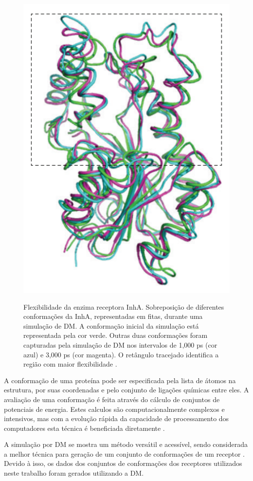 \begin{figure}[h]
	\center
	\includegraphics[scale=0.4]{images/dm_inha.png}
	\label{fig:dm}
	\caption{Flexibilidade da enzima receptora InhA. Sobreposição de diferentes conformações da InhA, representadas em fitas, durante uma simulação de DM. A conformação inicial da simulação está representada pela cor verde. Outras duas conformações foram capturadas pela simulação de DM nos intervalos de 1,000 ps (cor azul) e 3,000 ps (cor magenta). O retângulo tracejado identifica a região com maior flexibilidade \cite{REN13}.}
\end{figure}

A conformação de uma proteína pode ser especificada pela lista de átomos na estrutura, por suas coordenadas e pelo conjunto de ligações químicas entre eles. A avaliação de uma conformação é feita através do cálculo de conjuntos de potenciais de energia. Estes calculos são computacionalmente complexos e intensivos, mas com a evolução rápida da capacidade de processamento dos computadores esta técnica é beneficiada diretamente \cite{art08}.

A simulação por DM se mostra um método versátil e acessível, sendo considerada a melhor técnica para geração de um conjunto de conformações de um receptor \cite{kar11}. Devido à isso, os dados dos conjuntos de conformações dos receptores utilizados neste trabalho foram gerados utilizando a DM.


